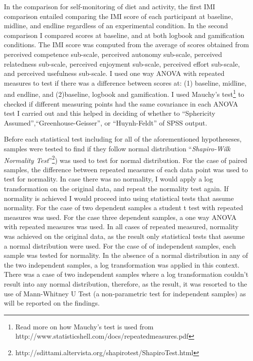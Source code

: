 In the comparison for self-monitoring of diet and activity, the first IMI comparison  entailed comparing the IMI score of each participant at baseline, midline, and endline regardless of an experimental condition. In the second comparison I compared scores at baseline, and at both logbook and gamification conditions. The IMI score was computed from the average of scores obtained from perceived competence sub-scale, perceived autonomy sub-scale, perceived relatedness sub-scale, perceived enjoyment sub-scale, perceived effort sub-scale, and perceived usefulness sub-scale. I  used one way ANOVA with repeated measures to test if there was a difference  between scores at: (1) baseline, midline, and endline, and (2)baseline, logbook and gamification. I used Mauchy's test\footnote{Read more on how Mauchy's test is used from http://www.statisticshell.com/docs/repeatedmeasures.pdf} to checked if different measuring points had the same covariance in each ANOVA test I carried out and this helped in deciding of whether to ``Sphericity Assumed'',``Greenhouse-Geisser'', or ``Huynh-Feldt'' of SPSS output.

Before each statistical test including for all of the aforementioned hypotheseses, samples were tested to find if they follow normal distribution ``\emph{Shapiro-Wilk Normality Test}''\footnote{http://sdittami.altervista.org/shapirotest/ShapiroTest.html}) was used to test for normal distribution. For the case of paired samples, the difference between repeated measures of each data point was used to test for normality. In case there was no normality, I would apply a log transformation on the original data, and repeat the normality test again. If normality is achieved I would proceed into using statistical tests that assume normality. For the case of two dependent samples a student t test with repeated measures was used. For the case three dependent samples, a one way ANOVA with repeated measures was used. In all cases of repeated measured, normality was achieved on the original data, as the result only statistical tests that assume a  normal distribution were used.  For the case of of independent samples, each sample was tested for normality. In the absence of a normal distribution in any of the two independent samples, a log transformation was applied in this context. There was a case of two independent samples where a log transformation couldn't result into any normal distribution, therefore, as the result, it was resorted to the use of Mann-Whitney U Test (a non-parametric test for independent samples) as will be reported on the findings. 
 

